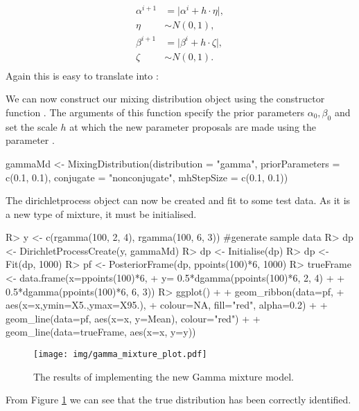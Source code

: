 \documentclass[nojss]{jss}
\begin{document}
\begin{align*}
\alpha ^{i+1} & = \lvert \alpha ^{i} + h \cdot \eta \lvert ,\\
\eta & \sim N(0, 1), \\
\beta ^{i+1} & = \lvert \beta ^{i} + h \cdot \zeta \lvert, \\
\zeta & \sim N(0, 1). \\
\end{align*}
Again this  is easy to translate into :

We can now construct our mixing distribution object using the constructor function . The arguments of this function specify the prior parameters $\alpha _0, \beta _0$ and set the scale $h$ at which the new parameter proposals are made using the parameter .
\begin{CodeInput}
gammaMd <- MixingDistribution(distribution = "gamma",
                              priorParameters = c(0.1, 0.1),
                              conjugate = "nonconjugate",
                              mhStepSize = c(0.1, 0.1))
\end{CodeInput}

The dirichletprocess object can now be created and fit to some test data. As it is a new type of mixture, it must be initialised.
\begin{Schunk}
\begin{Sinput}
R> y <- c(rgamma(100, 2, 4), rgamma(100, 6, 3)) #generate sample data
R> dp <- DirichletProcessCreate(y, gammaMd)
R> dp <- Initialise(dp)
R> dp <- Fit(dp, 1000)
R> pf <- PosteriorFrame(dp, ppoints(100)*6, 1000)
R> trueFrame <- data.frame(x=ppoints(100)*6,
+                            y= 0.5*dgamma(ppoints(100)*6, 2, 4) +
+                            0.5*dgamma(ppoints(100)*6, 6, 3))
R> ggplot() +
+    geom_ribbon(data=pf,
+                aes(x=x,ymin=X5.,ymax=X95.),
+                colour=NA, fill="red", alpha=0.2) +
+    geom_line(data=pf, aes(x=x, y=Mean), colour="red") +
+    geom_line(data=trueFrame, aes(x=x, y=y))
\end{Sinput}
\end{Schunk}
\begin{figure}[tb]
\centering
	\texttt{[image: img/gamma\_mixture\_plot.pdf]}
\caption{The results of implementing the new Gamma mixture model.}
\label{fig:gammamixture}
\end{figure}
From Figure \ref{fig:gammamixture} we can see that the true distribution has been correctly identified.
\end{document}

